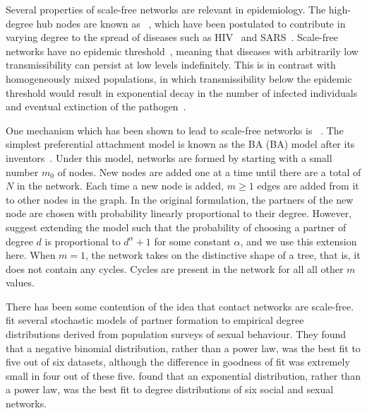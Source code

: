 Several properties of scale-free networks are relevant in epidemiology.  The
high-degree hub nodes are known as
~\autocite{kemper1980identification}, which have been
postulated to contribute in varying degree to the spread of diseases such as
\gls{HIV}~\autocite{stadler2013uncovering} and
\gls{SARS}~\autocite{shen2004superspreading}. Scale-free networks have no
epidemic threshold~\autocite{pastor2001epidemic}, meaning that diseases with
arbitrarily low transmissibility can persist at low levels indefinitely. This
is in contrast with homogeneously mixed populations, in which transmissibility
below the epidemic threshold would result in exponential decay in the number of
infected individuals and eventual extinction of the
pathogen~\autocite{anderson1992infectious}.

One mechanism which has been shown to lead to scale-free networks is
~\autocite{simon1955class,
barabasi1999emergence}. The simplest preferential attachment model is known as
the \acrlong{BA} (BA) model after its
inventors~\autocite{barabasi1999emergence}. Under this model, networks are
formed by starting with a small number $m_0$ of nodes. New nodes are added one
at a time until there are a total of $N$ in the network. Each time a new node
is added, $m \geq 1$ edges are added from it to other nodes in the graph. In
the original formulation, the partners of the new node are chosen with
probability linearly proportional to their degree. However,
\citeauthor{barabasi1999emergence} suggest extending the model such that the
probability of choosing a partner of degree $d$ is proportional to $d^\alpha +
1$ for some constant $\alpha$, and we use this extension here. When $m = 1$,
the network takes on the distinctive shape of a tree, that is, it does not
contain any cycles. Cycles are present in the network for all all other $m$
values.

There has been some contention of the idea that contact networks are
scale-free. \textcite{handcock2004likelihood} fit several stochastic models of
partner formation to empirical degree distributions derived from population
surveys of sexual behaviour. They found that a negative binomial distribution,
rather than a power law, was the best fit to five out of six datasets, although
the difference in goodness of fit was extremely small in four out of these
five. \textcite{bansal2007individual} found that an exponential distribution,
rather than a power law, was the best fit to degree distributions of six social
and sexual networks. 

